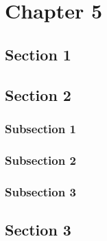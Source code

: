 \chapter{Chapter 5}%
\blindtext%
%
%
\section{Section 1}%
\blindtext%
%
%
\section{Section 2}%
\blindtext%
%
%
\subsection{Subsection 1}%
\blindtext%
%
%
\subsection{Subsection 2}%
\blindtext%
%
%
\subsection{Subsection 3}%
\blindtext%
%
%
\section{Section 3}%
\blindtext%
%
%
